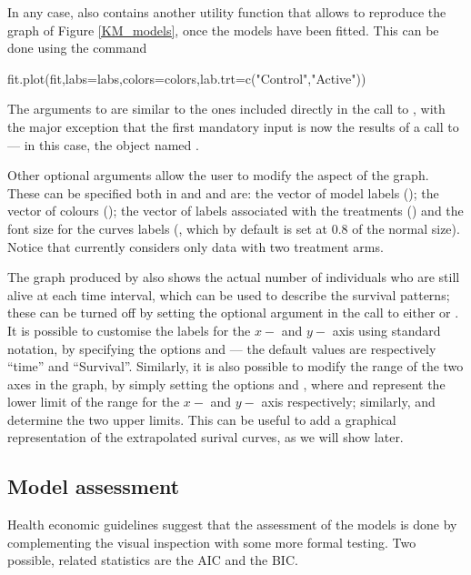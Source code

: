 \documentclass[article,nojss]{jss}
\newcommand{\R}{\proglang{R}\xspace}
\newcommand{\sh}{\proglang{survHE}\xspace}
\begin{document}
In any case, \sh also contains another utility function that allows to reproduce the graph of Figure \ref{KM_models}, once the models have been fitted. This can be done using the command
\begin{CodeInput}
fit.plot(fit,labs=labs,colors=colors,lab.trt=c("Control","Active"))
\end{CodeInput}
The arguments to  are similar to the ones included directly in the call to , with the major exception that the first mandatory input is now the results of a call to  --- in this case, the object named .

Other optional arguments allow the user to modify the aspect of the graph. These can be specified both in  and  and are: the vector of model labels (); the vector of colours (); the vector of labels associated with the treatments () and the font size for the curves labels (, which by default is set at 0.8 of the normal size). Notice that currently \sh considers only data with two treatment arms. 

The graph produced by \sh also shows the actual number of individuals who are still alive at each time interval, which can be used to describe the survival patterns; these can be turned off by setting the optional argument  in the call to either  or . It is possible to customise the labels for the $x-$ and $y-$ axis using standard \R notation, by specifying the options  and  --- the default values are respectively ``time'' and ``Survival''. Similarly, it is also possible to modify the range of the two axes in the graph, by simply setting the options  and , where  and  represent the lower limit of the range for the $x-$ and $y-$ axis respectively; similarly,  and  determine the two upper limits. This can be useful to add a graphical representation of the extrapolated surival curves, as we will show later.

\subsection{Model assessment}
Health economic guidelines suggest that the assessment of the models is done by complementing the visual inspection with some more formal testing. Two possible, related statistics are the AIC and the BIC. 
\end{document}
